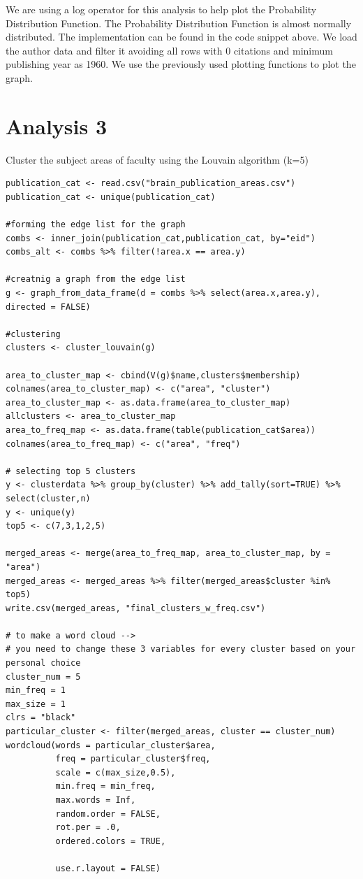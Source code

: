 \documentclass[a4paper,11pt]{article}
\theoremstyle{mytheor}
\begin{document}
We are using a log operator for this analysis to help plot the Probability Distribution Function.
The Probability Distribution Function is almost normally distributed. The implementation can be found in the code snippet above. We load the author data and filter it avoiding all rows with 0 citations and minimum publishing year as 1960. We use the previously used plotting functions to plot the graph.

\section*{Analysis 3}

Cluster the subject areas of faculty using the Louvain algorithm (k=5)

\begin{lstlisting}[label={list:first},caption=Cluster using Louvain algorithm]
publication_cat <- read.csv("brain_publication_areas.csv")
publication_cat <- unique(publication_cat)

#forming the edge list for the graph
combs <- inner_join(publication_cat,publication_cat, by="eid")
combs_alt <- combs %>% filter(!area.x == area.y)

#creatnig a graph from the edge list
g <- graph_from_data_frame(d = combs %>% select(area.x,area.y), directed = FALSE)

#clustering
clusters <- cluster_louvain(g)

area_to_cluster_map <- cbind(V(g)$name,clusters$membership)
colnames(area_to_cluster_map) <- c("area", "cluster")
area_to_cluster_map <- as.data.frame(area_to_cluster_map)
allclusters <- area_to_cluster_map
area_to_freq_map <- as.data.frame(table(publication_cat$area))
colnames(area_to_freq_map) <- c("area", "freq")

# selecting top 5 clusters 
y <- clusterdata %>% group_by(cluster) %>% add_tally(sort=TRUE) %>% select(cluster,n)
y <- unique(y)
top5 <- c(7,3,1,2,5)

merged_areas <- merge(area_to_freq_map, area_to_cluster_map, by = "area")
merged_areas <- merged_areas %>% filter(merged_areas$cluster %in% top5)
write.csv(merged_areas, "final_clusters_w_freq.csv")

# to make a word cloud -->
# you need to change these 3 variables for every cluster based on your personal choice
cluster_num = 5
min_freq = 1
max_size = 1
clrs = "black"
particular_cluster <- filter(merged_areas, cluster == cluster_num)
wordcloud(words = particular_cluster$area,
          freq = particular_cluster$freq,
          scale = c(max_size,0.5),
          min.freq = min_freq,
          max.words = Inf,
          random.order = FALSE,
          rot.per = .0,
          ordered.colors = TRUE,
          
          use.r.layout = FALSE)
\end{lstlisting}
\end{document}

